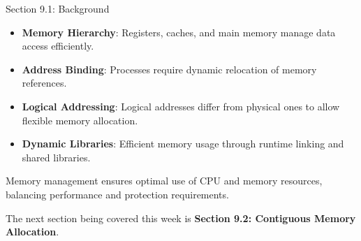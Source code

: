 \begin{notes}{Section 9.1: Background}
\begin{highlight}
    \end{highlight}
    
    \begin{highlight}
    
        \begin{itemize}
            \item \textbf{Memory Hierarchy}: Registers, caches, and main memory manage data access efficiently.
            \item \textbf{Address Binding}: Processes require dynamic relocation of memory references.
            \item \textbf{Logical Addressing}: Logical addresses differ from physical ones to allow flexible memory allocation.
            \item \textbf{Dynamic Libraries}: Efficient memory usage through runtime linking and shared libraries.
        \end{itemize}
    
    Memory management ensures optimal use of CPU and memory resources, balancing performance and protection requirements.
        
    \end{highlight}
\end{notes}

The next section being covered this week is \textbf{Section 9.2: Contiguous Memory Allocation}.

